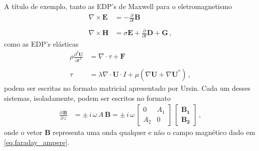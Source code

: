 A t\'itulo de exemplo, tanto as EDP's de Maxwell para o eletromagnetismo
\begin{align}\label{eq.faraday_ampere}\nonumber
\nabla\times\mathbf{E}&=-\frac{\partial}{\partial t}\mathbf{B}\\\\\nonumber
\nabla\times\mathbf{H}&=\sigma\mathbf{E}+\frac{\partial}{\partial t}\mathbf{D}+\mathbf{G}\,,
\end{align}
como as EDP's el\'asticas
\begin{align}\label{eq.cauchy_hooke}\nonumber
\rho\frac{\partial^2 \mathbf{U}}{\partial t^2}&=\nabla\cdot\tau+\mathbf{F}\\\\\nonumber
\tau&=\lambda\nabla\cdot \mathbf{U}\cdot I + \mu(\nabla \mathbf{U}+\nabla \mathbf{U}^*)\,,
\end{align}
podem ser escritas no formato matricial apresentado por Ursin. Cada um desses sistemas, isoladamente, podem ser escritos no formato 
\begin{align}\label{eq.matricial}
\frac{\partial\,\mathbf{B}}{\partial\,z} &= \pm\,i\,\omega\,A\,\mathbf{B} = \pm\,i\,\omega\,
\begin{bmatrix}
0&A_1\\
A_2&0
\end{bmatrix}\,
\begin{bmatrix}
\mathbf{B_1}\\
\mathbf{B_2}	
\end{bmatrix}\,,
\end{align}
onde o vetor $\mathbf{B}$ representa uma onda qualquer e n\~ao o campo magn\'etico dado em \ref{eq.faraday_ampere}.

